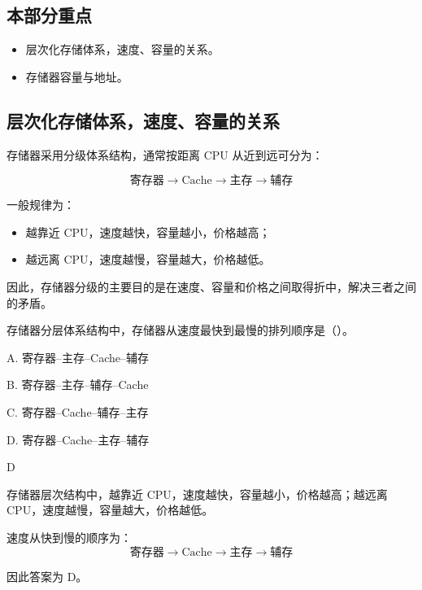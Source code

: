 \subsection*{本部分重点}
\begin{itemize}
    \item 层次化存储体系，速度、容量的关系。
    \item 存储器容量与地址。
\end{itemize}


\subsection{层次化存储体系，速度、容量的关系}

\begin{knowledge}
存储器采用分级体系结构，通常按距离 CPU 从近到远可分为：

\[
\text{寄存器} \rightarrow \text{Cache} \rightarrow \text{主存} \rightarrow \text{辅存}
\]

一般规律为：

\begin{itemize}
    \item 越靠近 CPU，速度越快，容量越小，价格越高；
    \item 越远离 CPU，速度越慢，容量越大，价格越低。
\end{itemize}

因此，存储器分级的主要目的是在速度、容量和价格之间取得折中，解决三者之间的矛盾。
\end{knowledge}


\begin{question}
存储器分层体系结构中，存储器从速度最快到最慢的排列顺序是（）。

A. 寄存器--主存--Cache--辅存

B. 寄存器--主存--辅存--Cache

C. 寄存器--Cache--辅存--主存

D. 寄存器--Cache--主存--辅存
\end{question}

\begin{answer}
D
\end{answer}

\begin{analysisenv}
存储器层次结构中，越靠近 CPU，速度越快，容量越小，价格越高；越远离 CPU，速度越慢，容量越大，价格越低。

速度从快到慢的顺序为：
\[
\text{寄存器} \rightarrow \text{Cache} \rightarrow \text{主存} \rightarrow \text{辅存}
\]

因此答案为 D。
\end{analysisenv}


